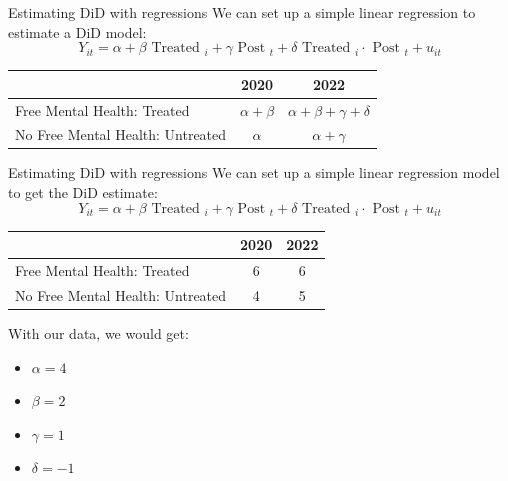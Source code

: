 \documentclass[11pt]{beamer}
\begin{document}
\begin{frame}{Estimating DiD with regressions}
We can set up a simple linear regression to estimate a  DiD model:
$$
Y_{i t}=\alpha+\beta \text { Treated }_i+\gamma \text { Post }_t+\delta \text { Treated }_i \cdot \text { Post }_t+u_{i t}
$$



\begin{table}[]
\begin{tabular}{lcc}
\toprule
\textbf{}                        & \textbf{2020} & \textbf{2022} \\ \midrule
Free Mental Health: Treated      &    $\alpha + \beta$       & $\alpha + \beta + \gamma + \delta$          \\ \midrule
No Free Mental Health: Untreated &    $\alpha$       & $\alpha + \gamma$        \\ \bottomrule
\end{tabular}
\end{table}


\end{frame}










\begin{frame}{Estimating DiD with regressions}
We can set up a simple linear regression model to get the DiD estimate:
$$
Y_{i t}=\alpha+\beta \text { Treated }_i+\gamma \text { Post }_t+\delta \text { Treated }_i \cdot \text { Post }_t+u_{i t}
$$
\begin{table}[]
\begin{tabular}{lcc}
\toprule
\textbf{}                        & \textbf{2020} & \textbf{2022} \\ \midrule
Free Mental Health: Treated      &    6       & 6          \\ \midrule
No Free Mental Health: Untreated &    4       & 5        \\ \bottomrule
\end{tabular}
\end{table}

With our data, we would get:
\begin{itemize}
\item $\alpha = 4$
\item $\beta = 2$
\item $\gamma = 1$
\item $\delta = -1$

\end{itemize}


\end{frame}
\end{document}
